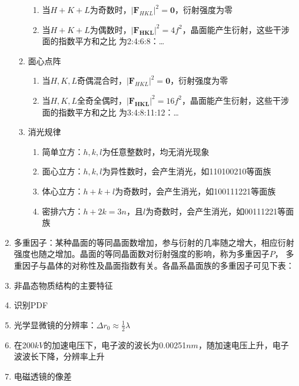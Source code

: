 \documentclass[12pt,a4paper]{article}
\begin{document}
\begin{enumerate}
\begin{enumerate}
\begin{enumerate}
                \item 当$H+K+L$为奇数时，$\left|\boldsymbol{F}_{H K L}\right|^{2}=\mathbf{0}$，衍射强度为零
                \item 当$H+K+L$为偶数时，$\left|\boldsymbol{F}_{\boldsymbol{H K L}}\right|^{2}=4 f^{2}$，晶面能产生衍射，这些干涉面的指数平方和之比
                    为2:4:6:8：\dots
            \end{enumerate}
            \item 面心点阵
            \begin{enumerate}
                \item 当$H,K,L$奇偶混合时，$\left|\boldsymbol{F}_{H K L}\right|^{2}=\mathbf{0}$，衍射强度为零
                \item 当$H,K,L$全奇全偶时，$\left|\boldsymbol{F}_{\boldsymbol{H K L}}\right|^{2}=16 f^{2}$，晶面能产生衍射，这些干涉面的指数平方和之比
                    为3:4:8:11:12：\dots
            \end{enumerate}
            \item 消光规律
            \begin{enumerate}
                \item 简单立方：$h,k,l$为任意整数时，均无消光现象
                \item 面心立方：$h,k,l$为异性数时，会产生消光，如{110}{100}{210}等面族
                \item 体心立方：$h+k+l$为奇数时，会产生消光，如{100}{111}{221}等面族
                \item 密排六方：$h+2k=3n$，且$l$为奇数时，会产生消光，如{001}{11}{221}等面族
            \end{enumerate}
        \end{enumerate}
        \item 多重因子：某种晶面的等同晶面数增加，参与衍射的几率随之增大，相应衍射强度也随之增加。晶面的等同晶面数对衍射强度的影响，称为多重因子$P$，
            多重因子与晶体的对称性及晶面指数有关。各晶系晶面族的多重因子可见下表：
        \item 非晶态物质结构的主要特征
        \item 识别PDF
        \item 光学显微镜的分辨率：$\Delta r_{0} \approx \frac{1}{2} \lambda$
        \item 在200$kV$的加速电压下，电子波的波长为0.00251$nm$，随加速电压上升，电子波波长下降，分辨率上升
        \item 电磁透镜的像差
        \begin{enumerate}

\end{enumerate}
\end{enumerate}
\end{document}
